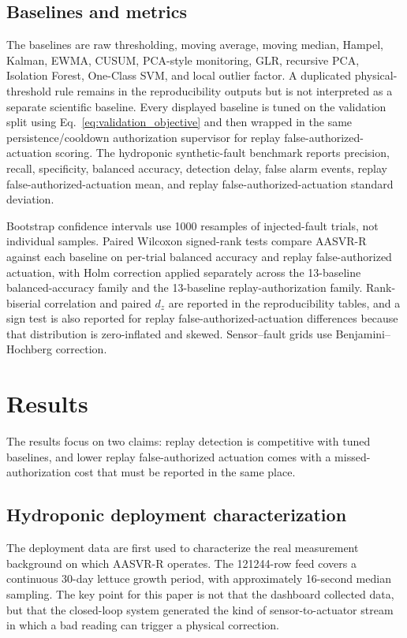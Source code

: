 \documentclass[preprint,12pt,doubleblind]{elsarticle}
\begin{document}
\subsection{Baselines and metrics}
The baselines are raw thresholding, moving average, moving median, Hampel, Kalman, EWMA, CUSUM, PCA-style monitoring, GLR, recursive PCA, Isolation Forest, One-Class SVM, and local outlier factor. A duplicated physical-threshold rule remains in the reproducibility outputs but is not interpreted as a separate scientific baseline. Every displayed baseline is tuned on the validation split using Eq.~\eqref{eq:validation_objective} and then wrapped in the same persistence/cooldown authorization supervisor for replay false-authorized-actuation scoring. The hydroponic synthetic-fault benchmark reports precision, recall, specificity, balanced accuracy, detection delay, false alarm events, replay false-authorized-actuation mean, and replay false-authorized-actuation standard deviation.

Bootstrap confidence intervals use 1000 resamples of injected-fault trials, not individual samples. Paired Wilcoxon signed-rank tests compare AASVR-R against each baseline on per-trial balanced accuracy and replay false-authorized actuation, with Holm correction applied separately across the 13-baseline balanced-accuracy family and the 13-baseline replay-authorization family. Rank-biserial correlation and paired $d_z$ are reported in the reproducibility tables, and a sign test is also reported for replay false-authorized-actuation differences because that distribution is zero-inflated and skewed. Sensor--fault grids use Benjamini--Hochberg correction.

\FloatBarrier

\section{Results}
The results focus on two claims: replay detection is competitive with tuned baselines, and lower replay false-authorized actuation comes with a missed-authorization cost that must be reported in the same place.

\subsection{Hydroponic deployment characterization}
The deployment data are first used to characterize the real measurement background on which AASVR-R operates. The 121244-row feed covers a continuous 30-day lettuce growth period, with approximately 16-second median sampling. The key point for this paper is not that the dashboard collected data, but that the closed-loop system generated the kind of sensor-to-actuator stream in which a bad reading can trigger a physical correction.
\end{document}
